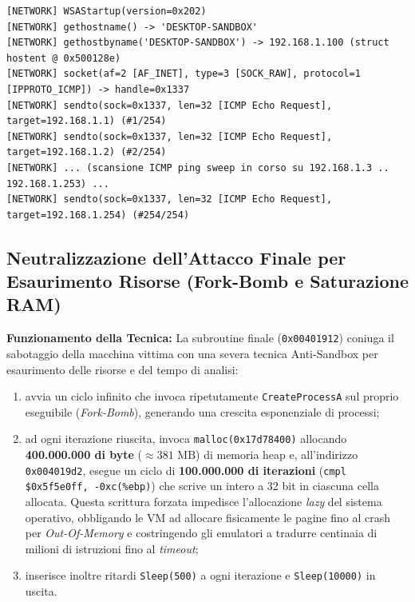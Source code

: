 \documentclass[11pt, a4paper]{article}
\begin{document}
\noindent\begin{minipage}{\linewidth}
\begin{lstlisting}[style=consoleout, caption={Log della risoluzione hostent e del Ping Sweep ICMP sui 254 indirizzi della sottorete locale.}, label={lst:astaroth_net_out}]
[NETWORK] WSAStartup(version=0x202)
[NETWORK] gethostname() -> 'DESKTOP-SANDBOX'
[NETWORK] gethostbyname('DESKTOP-SANDBOX') -> 192.168.1.100 (struct hostent @ 0x500128e)
[NETWORK] socket(af=2 [AF_INET], type=3 [SOCK_RAW], protocol=1 [IPPROTO_ICMP]) -> handle=0x1337
[NETWORK] sendto(sock=0x1337, len=32 [ICMP Echo Request], target=192.168.1.1) (#1/254)
[NETWORK] sendto(sock=0x1337, len=32 [ICMP Echo Request], target=192.168.1.2) (#2/254)
[NETWORK] ... (scansione ICMP ping sweep in corso su 192.168.1.3 .. 192.168.1.253) ...
[NETWORK] sendto(sock=0x1337, len=32 [ICMP Echo Request], target=192.168.1.254) (#254/254)
\end{lstlisting}
\end{minipage}


\subsection{Neutralizzazione dell'Attacco Finale per Esaurimento Risorse (Fork-Bomb e Saturazione RAM)}

\textbf{Funzionamento della Tecnica:} La subroutine finale (\texttt{0x00401912}) coniuga il sabotaggio della macchina vittima con una severa tecnica Anti-Sandbox per esaurimento delle risorse e del tempo di analisi:
\begin{enumerate}
	\item avvia un ciclo infinito che invoca ripetutamente \texttt{Create\allowbreak{}ProcessA} sul proprio eseguibile (\textit{Fork-Bomb}), generando una crescita esponenziale di processi;
	\item ad ogni iterazione riuscita, invoca \texttt{malloc\allowbreak{}(0x17d78400)} allocando \textbf{400.000.000 di byte} ($\approx 381\textrm{ MB}$) di memoria heap e, all'indirizzo \texttt{0x004019d2}, esegue un ciclo di \textbf{100.000.000 di iterazioni} (\texttt{cmpl \$0x5f5e0ff, -0xc(\%ebp)}) che scrive un intero a 32 bit in ciascuna cella allocata. Questa scrittura forzata impedisce l'allocazione \textit{lazy} del sistema operativo, obbligando le VM ad allocare fisicamente le pagine fino al crash per \textit{Out-Of-Memory} e costringendo gli emulatori a tradurre centinaia di milioni di istruzioni fino al \textit{timeout};
	\item inserisce inoltre ritardi \texttt{Sleep(500)} a ogni iterazione e \texttt{Sleep(10000)} in uscita.
\end{enumerate}
\end{document}
